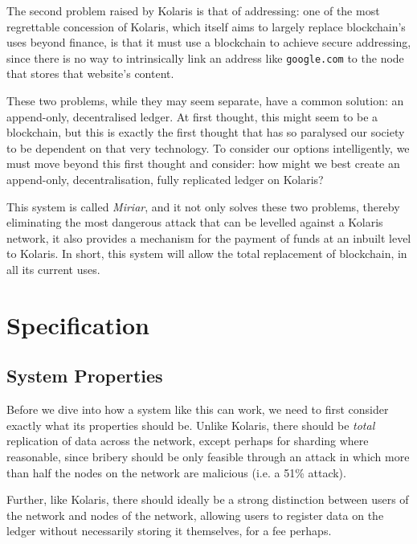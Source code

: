\documentclass{extreport}
\begin{document}
The second problem raised by Kolaris is that of addressing: one of the most regrettable concession of Kolaris, which itself aims to largely replace blockchain's uses beyond finance, is that it must use a blockchain to achieve secure addressing, since there is no way to intrinsically link an address like \texttt{google.com} to the node that stores that website's content.

These two problems, while they may seem separate, have a common solution: an append-only, decentralised ledger. At first thought, this might seem to be a blockchain, but this is exactly the first thought that has so paralysed our society to be dependent on that very technology. To consider our options intelligently, we must move beyond this first thought and consider: how might we best create an append-only, decentralisation, fully replicated ledger on Kolaris?

This system is called \emph{Miriar}, and it not only solves these two problems, thereby eliminating the most dangerous attack that can be levelled against a Kolaris network, it also provides a mechanism for the payment of funds at an inbuilt level to Kolaris. In short, this system will allow the total replacement of blockchain, in all its current uses.

\part{Specification}
\label{sec:orge7887dd}

\chapter{System Properties}
\label{sec:org6c6d895}

Before we dive into how a system like this can work, we need to first consider exactly what its properties should be. Unlike Kolaris, there should be \emph{total} replication of data across the network, except perhaps for sharding where reasonable, since bribery should be only feasible through an attack in which more than half the nodes on the network are malicious (i.e. a 51\% attack).

Further, like Kolaris, there should ideally be a strong distinction between users of the network and nodes of the network, allowing users to register data on the ledger without necessarily storing it themselves, for a fee perhaps.
\end{document}
